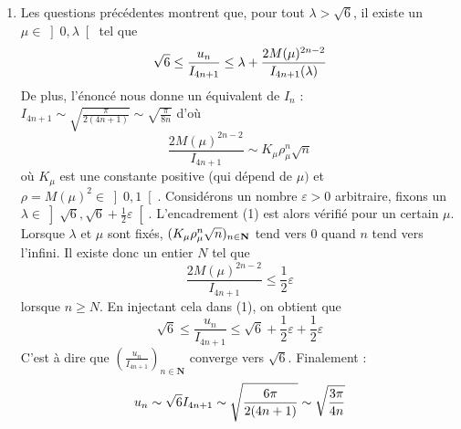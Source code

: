 \begin{enumerate}
\item  Les questions pr\'{e}c\'{e}dentes montrent que, pour tout $\lambda >%
\sqrt{6}$, il existe un $\mu \in \left] 0,\lambda \right[ $ tel que 
\begin{equation}
\sqrt{6}\leq \frac{u_{n}}{I_{4n+1}}\leq \lambda +\frac{2M(\mu )^{2n-2}}{%
I_{4n+1}(\lambda )}
\end{equation}
De plus, l'\'{e}nonc\'{e} nous donne un \'{e}quivalent de $I_{n}$ : $%
I_{4n+1}\sim \sqrt{\frac{\pi }{2(4n+1)}}\sim \sqrt{\frac{\pi }{8n}}$
d'o\`{u} 
\[
\frac{2M(\mu )^{2n-2}}{I_{4n+1}}\sim K_{\mu }\rho _{\mu }^{n}\sqrt{n} 
\]
o\`{u} $K_{\mu }$ est une constante positive (qui d\'{e}pend de $\mu )$ et $%
\rho =M(\mu )^{2}\in \left] 0,1\right[ $.\newline
Consid\'{e}rons un nombre $\varepsilon >0$ arbitraire, fixons un $\lambda
\in \left] \sqrt{6},\sqrt{6}+\frac{1}{2}\varepsilon \right[ $. L'encadrement
(1) est alors v\'{e}rifi\'{e} pour un certain $\mu $.\newline
Lorsque $\lambda $ et $\mu $ sont fix\'{e}s, $(K_{\mu }\rho _{\mu }^{n}\sqrt{%
n})_{n\in \mathbf{N}}$ tend vers 0 quand $n$ tend vers l'infini. Il existe
donc un entier $N$ tel que 
\[
\frac{2M(\mu )^{2n-2}}{I_{4n+1}}\leq \frac{1}{2}\varepsilon 
\]
lorsque $n\geq N$. En injectant cela dans (1), on obtient que 
\[
\sqrt{6}\leq \frac{u_{n}}{I_{4n+1}}\leq \sqrt{6}+\frac{1}{2}\varepsilon +%
\frac{1}{2}\varepsilon 
\]
C'est \`{a} dire que $(\frac{u_{n}}{I_{4n+1}})_{n\in \mathbf{N}}$ converge
vers $\sqrt{6}$. Finalement : 
\[
u_{n}\sim \sqrt{6}I_{4n+1}\sim \sqrt{\frac{6\pi }{2(4n+1)}}\sim \sqrt{\frac{%
3\pi }{4n}} 
\]
\end{enumerate}
